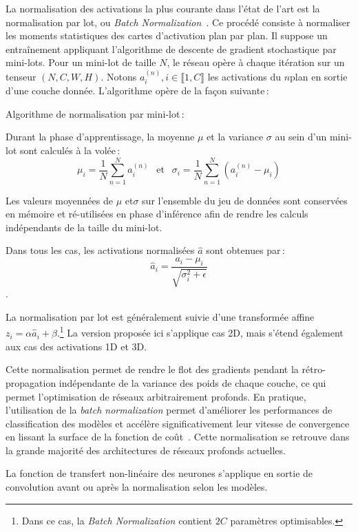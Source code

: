 La normalisation des activations la plus courante dans l'état de l'art est la normalisation par lot, ou \emph{Batch Normalization}~\cite{ioffe_batch_2015}. Ce procédé consiste à normaliser les moments statistiques des cartes d'activation plan par plan. Il suppose un entraînement appliquant l'algorithme de descente de gradient stochastique par mini-lots. Pour un mini-lot de taille $N$, le réseau opère à chaque itération sur un tenseur $(N, C, W, H)$. Notons $a^{(n)}_i, i \in \llbracket 1,C \rrbracket$ les activations du $n$\ieme plan en sortie d'une couche donnée. L'algorithme opère de la façon suivante\,:
\begin{definition}
Algorithme de normalisation par mini-lot\,:

Durant la phase d'apprentissage, la moyenne $\mu$ et la variance $\sigma$ au sein d'un mini-lot sont calculés à la volée\,:
$$\mu_i = \frac{1}{N} \sum_{n=1}^N a_i^{(n)}~~\text{ et }~~\sigma_i = \frac{1}{N} \sum_{n=1}^N (a_i^{(n)} - \mu_i)$$

Les valeurs moyennées de $\mu$ et$\sigma$ sur l'ensemble du jeu de données sont conservées en mémoire et ré-utilisées en phase d'inférence afin de rendre les calculs indépendants de la taille du mini-lot.

Dans tous les cas, les activations normalisées $\hat{a}$ sont obtenues par\,:
$$\hat{a}_i = \frac{a_i - \mu_i}{\sqrt{\sigma_i^2 + \epsilon}}$$.
\end{definition}

La normalisation par lot est généralement suivie d'une transformée affine $z_i = \alpha \hat{a}_i + \beta$.\footnote{Dans ce cas, la \emph{Batch Normalization} contient $2C$ paramètres optimisables.} La version proposée ici s'applique cas 2D, mais s'étend également aux cas des activations 1D et 3D.

Cette normalisation permet de rendre le flot des gradients pendant la rétro-propagation indépendante de la variance des poids de chaque couche, ce qui permet l'optimisation de réseaux arbitrairement profonds. En pratique, l'utilisation de la \emph{batch normalization} permet d'améliorer les performances de classification des modèles et accélère significativement leur vitesse de convergence en lissant la surface de la fonction de coût~\cite{santurkar_how_2018}. Cette normalisation se retrouve dans la grande majorité des architectures de réseaux profonds actuelles.

La fonction de transfert non-linéaire des neurones s'applique en sortie de convolution avant ou après la normalisation selon les modèles.

